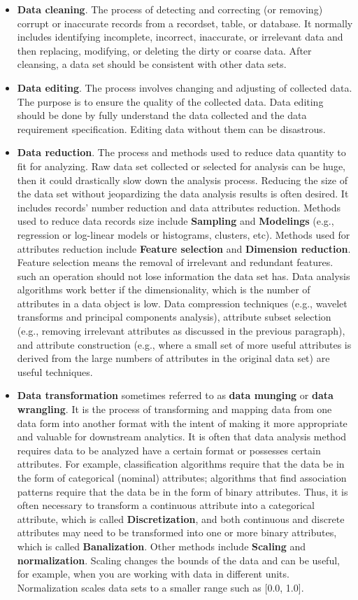 \documentclass[
]{book}
\begin{document}
\begin{itemize}
\item
  \textbf{Data cleaning}. The process of detecting and correcting (or removing) corrupt or inaccurate records from a recordset, table, or database. It normally includes identifying incomplete, incorrect, inaccurate, or irrelevant data and then replacing, modifying, or deleting the dirty or coarse data. After cleansing, a data set should be consistent with other data sets.
\item
  \textbf{Data editing}. The process involves changing and adjusting of collected data. The purpose is to ensure the quality of the collected data. Data editing should be done by fully understand the data collected and the data requirement specification. Editing data without them can be disastrous.
\item
  \textbf{Data reduction}. The process and methods used to reduce data quantity to fit for analyzing. Raw data set collected or selected for analysis can be huge, then it could drastically slow down the analysis process. Reducing the size of the data set without jeopardizing the data analysis results is often desired. It includes records' number reduction and data attributes reduction. Methods used to reduce data records size include \textbf{Sampling} and \textbf{Modelings} (e.g., regression or log-linear models or histograms, clusters, etc). Methods used for attributes reduction include \textbf{Feature selection} and \textbf{Dimension reduction}. Feature selection means the removal of irrelevant and redundant features. such an operation should not lose information the data set has. Data analysis algorithms work better if the dimensionality, which is the number of attributes in a data object is low. Data compression techniques (e.g., wavelet transforms and principal components analysis), attribute subset selection (e.g., removing irrelevant attributes as discussed in the previous paragraph), and attribute construction (e.g., where a small set of more useful attributes is derived from the large numbers of attributes in the original data set) are useful techniques.
\item
  \textbf{Data transformation} sometimes referred to as \textbf{data munging} or \textbf{data wrangling}. It is the process of transforming and mapping data from one data form into another format with the intent of making it more appropriate and valuable for downstream analytics. It is often that data analysis method requires data to be analyzed have a certain format or possesses certain attributes. For example, classification algorithms require that the data be in the form of categorical (nominal) attributes; algorithms that find association patterns require that the data be in the form of binary attributes. Thus, it is often necessary to transform a continuous attribute into a categorical attribute, which is called \textbf{Discretization}, and both continuous and discrete attributes may need to be transformed into one or more binary attributes, which is called \textbf{Banalization}. Other methods include \textbf{Scaling} and \textbf{normalization}. Scaling changes the bounds of the data and can be useful, for example, when you are working with data in different units. Normalization scales data sets to a smaller range such as {[}0.0, 1.0{]}.

\end{itemize}
\end{document}
